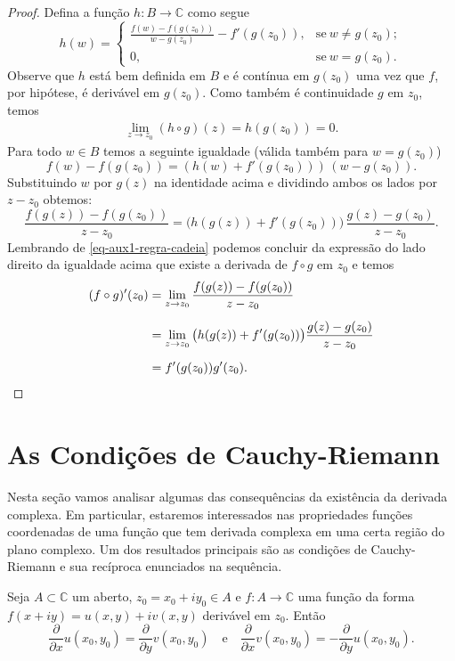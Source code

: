 \begin{proof}
Defina a função $h:B\to\mathbb{C}$ como segue
\[
h(w)
=
\begin{cases}
\displaystyle\frac{f(w)-f(g(z_0))}{w-g(z_0)}- f'(g(z_0)),&\text{se}\ w\neq g(z_0);\\
0,&\text{se}\ w=g(z_0).
\end{cases} 
\]
Observe que $h$ está bem definida em $B$ e é contínua em $g(z_0)$
uma vez que $f$, por hipótese, é derivável em $g(z_0)$. 
Como também é continuidade $g$ em $z_0$, temos
\begin{align}\label{eq-aux1-regra-cadeia}
\lim_{z\to z_0} (h\circ g)(z) = h(g(z_0))=0.
\end{align}
Para todo $w\in B$ temos a seguinte igualdade (válida também para $w=g(z_0)$)
\[
f(w)-f(g(z_0))= ( h(w)+f'(g(z_0)))\,(w-g(z_0)).
\]
Substituindo $w$ por $g(z)$ na identidade acima e dividindo ambos os lados por $z-z_0$ obtemos:
\[
\frac{ f(g(z)) - f(g(z_0))  }{ z-z_0 } 
=  
\big(  h(g(z))+ f'(g(z_0))   \big) 
\,\frac{g(z)-g(z_0)}{z-z_0}.
\]
Lembrando de \eqref{eq-aux1-regra-cadeia}  
podemos concluir  da expressão do lado direito da igualdade acima que existe a derivada de $f\circ g$
em $z_0$ e temos
\begin{align*}
(f\circ g)'(z_0)
&=
\lim_{z\to z_0}
\frac{ f(g(z)) - f(g(z_0))  }{ z-z_0 } 
\\[0.2cm]
&=  
\lim_{z\to z_0}
\big(  h(g(z))+ f'(g(z_0))   \big) \frac{g(z)-g(z_0)}{z-z_0}
\\[0.2cm]
&=
f'(g(z_0))g'(z_0).
\qedhere
\end{align*}
\end{proof}


\section{As Condições de Cauchy-Riemann}

Nesta seção vamos analisar algumas das consequências da existência da derivada complexa.
Em particular, estaremos interessados nas propriedades funções coordenadas de uma função 
que tem derivada complexa em uma certa região do plano complexo. Um dos resultados
principais são as condições de Cauchy-Riemann e sua recíproca enunciados na sequência.

\begin{proposicao}
\label{prop-cond-Cauchy-Riemann}
Seja $A\subset \mathbb{C}$ um aberto, $z_0=x_0+iy_0\in A$ e $f:A\to\mathbb{C}$
uma função da forma $f(x+iy)=u(x,y)+iv(x,y)$  derivável em $z_0$. Então
\[
\frac{\partial}{\partial x}u(x_0,y_0)=\frac{\partial}{\partial y}v(x_0,y_0)
\quad\text{e}\quad
\frac{\partial}{\partial x}v(x_0,y_0)=-\frac{\partial}{\partial y}u(x_0,y_0).
\]
\end{proposicao}

